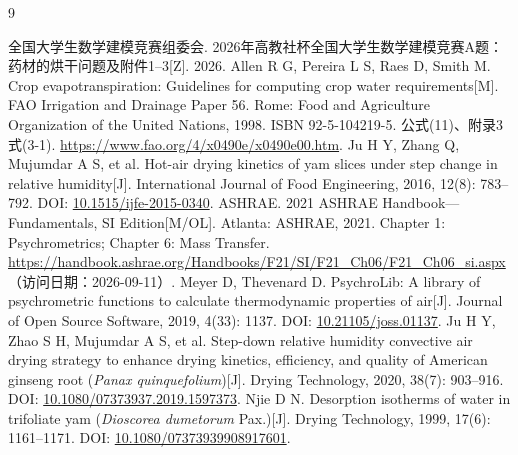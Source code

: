 \begin{thebibliography}{9}
\raggedright
{} 全国大学生数学建模竞赛组委会. 2026年高教社杯全国大学生数学建模竞赛A题：药材的烘干问题及附件1--3[Z]. 2026.
 Allen R G, Pereira L S, Raes D, Smith M. Crop evapotranspiration: Guidelines for computing crop water requirements[M]. FAO Irrigation and Drainage Paper 56. Rome: Food and Agriculture Organization of the United Nations, 1998. ISBN 92-5-104219-5. 公式(11)、附录3式(3-1). \url{https://www.fao.org/4/x0490e/x0490e00.htm}.
 Ju H Y, Zhang Q, Mujumdar A S, et al. Hot-air drying kinetics of yam slices under step change in relative humidity[J]. International Journal of Food Engineering, 2016, 12(8): 783--792. DOI: \href{https://doi.org/10.1515/ijfe-2015-0340}{10.1515/ijfe-2015-0340}.
 ASHRAE. 2021 ASHRAE Handbook---Fundamentals, SI Edition[M/OL]. Atlanta: ASHRAE, 2021. Chapter 1: Psychrometrics; Chapter 6: Mass Transfer. \url{https://handbook.ashrae.org/Handbooks/F21/SI/F21_Ch06/F21_Ch06_si.aspx}（访问日期：2026-09-11）.
 Meyer D, Thevenard D. PsychroLib: A library of psychrometric functions to calculate thermodynamic properties of air[J]. Journal of Open Source Software, 2019, 4(33): 1137. DOI: \href{https://doi.org/10.21105/joss.01137}{10.21105/joss.01137}.
 Ju H Y, Zhao S H, Mujumdar A S, et al. Step-down relative humidity convective air drying strategy to enhance drying kinetics, efficiency, and quality of American ginseng root (\textit{Panax quinquefolium})[J]. Drying Technology, 2020, 38(7): 903--916. DOI: \href{https://doi.org/10.1080/07373937.2019.1597373}{10.1080/07373937.2019.1597373}.
 Njie D N. Desorption isotherms of water in trifoliate yam (\textit{Dioscorea dumetorum} Pax.)[J]. Drying Technology, 1999, 17(6): 1161--1171. DOI: \href{https://doi.org/10.1080/07373939908917601}{10.1080/07373939908917601}.
\end{thebibliography}
